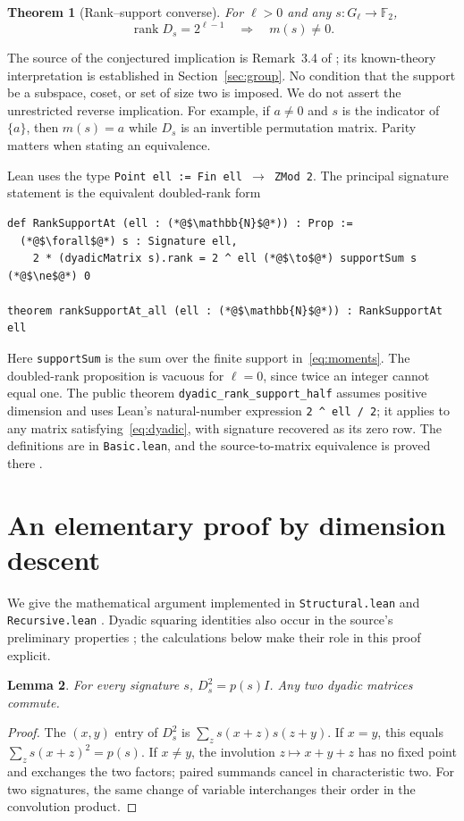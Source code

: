 \documentclass[11pt]{article}
\newtheorem{theorem}{Theorem}[section]
\newtheorem{lemma}[theorem]{Lemma}
\theoremstyle{definition}
\newcommand{\F}{\mathbb F_2}
\newcommand{\rk}{\operatorname{rank}}
\begin{document}
\begin{theorem}[Rank--support converse]\label{thm:main}
For $\ell>0$ and any $s:G_\ell\to\F$,
\[
 \rk D_s=2^{\ell-1}\quad\Longrightarrow\quad m(s)\ne0.
\]
\end{theorem}

The source of the conjectured implication is Remark~3.4 of \cite{gf}; its known-theory interpretation is established in Section~\ref{sec:group}. No condition that the support be a subspace, coset, or set of size two is imposed. We do not assert the unrestricted reverse implication. For example, if $a\ne0$ and $s$ is the indicator of $\{a\}$, then $m(s)=a$ while $D_s$ is an invertible permutation matrix. Parity matters when stating an equivalence.

Lean uses the type \texttt{Point ell := Fin ell $\to$ ZMod 2}. The principal signature statement is the equivalent doubled-rank form
\begin{lstlisting}[float=htbp,caption={The general signature interface.}]
def RankSupportAt (ell : (*@$\mathbb{N}$@*)) : Prop :=
  (*@$\forall$@*) s : Signature ell,
    2 * (dyadicMatrix s).rank = 2 ^ ell (*@$\to$@*) supportSum s (*@$\ne$@*) 0

theorem rankSupportAt_all (ell : (*@$\mathbb{N}$@*)) : RankSupportAt ell
\end{lstlisting}
Here \texttt{supportSum} is the sum over the finite support in~\eqref{eq:moments}. The doubled-rank proposition is vacuous for $\ell=0$, since twice an integer cannot equal one. The public theorem \nolinkurl{dyadic_rank_support_half} assumes positive dimension and uses Lean's natural-number expression \texttt{2 \^{} ell / 2}; it applies to any matrix satisfying~\eqref{eq:dyadic}, with signature recovered as its zero row. The definitions are in \texttt{Basic.lean}, and the source-to-matrix equivalence is proved there \cite{artifact}.

\section{An elementary proof by dimension descent}\label{sec:proof}

We give the mathematical argument implemented in \texttt{Structural.lean} and \texttt{Recursive.lean} \cite{artifact}. Dyadic squaring identities also occur in the source's preliminary properties \cite[Proposition~2.2]{gf}; the calculations below make their role in this proof explicit.

\begin{lemma}\label{lem:square}
For every signature $s$, $D_s^2=p(s)I$. Any two dyadic matrices commute.
\end{lemma}
\begin{proof}
The $(x,y)$ entry of $D_s^2$ is $\sum_z s(x+z)s(z+y)$. If $x=y$, this equals $\sum_z s(x+z)^2=p(s)$. If $x\ne y$, the involution $z\mapsto x+y+z$ has no fixed point and exchanges the two factors; paired summands cancel in characteristic two. For two signatures, the same change of variable interchanges their order in the convolution product.
\end{proof}
\end{document}
